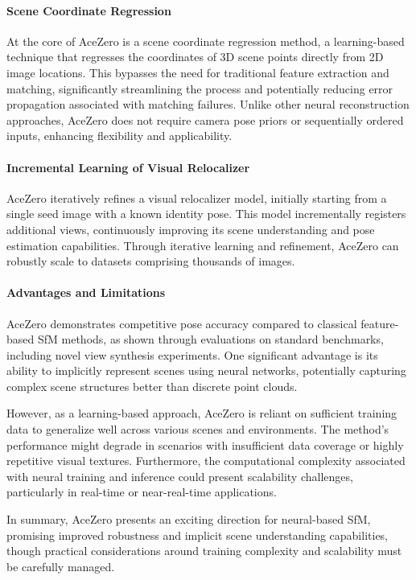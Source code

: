 \paragraph{Scene Coordinate Regression}
At the core of AceZero is a scene coordinate regression method, a learning-based technique that regresses the coordinates of 3D scene points directly from 2D image locations. 
This bypasses the need for traditional feature extraction and matching, significantly streamlining the process and potentially reducing error propagation associated with matching failures. Unlike other neural reconstruction approaches, AceZero does not require camera pose priors or sequentially ordered inputs, enhancing flexibility and applicability.

\paragraph{Incremental Learning of Visual Relocalizer}
AceZero iteratively refines a visual relocalizer model, initially starting from a single seed image with a known identity pose. 
This model incrementally registers additional views, continuously improving its scene understanding and pose estimation capabilities. 
Through iterative learning and refinement, AceZero can robustly scale to datasets comprising thousands of images.

\paragraph{Advantages and Limitations}
AceZero demonstrates competitive pose accuracy compared to classical feature-based SfM methods, as shown through evaluations on standard benchmarks, including novel view synthesis experiments. 
One significant advantage is its ability to implicitly represent scenes using neural networks, potentially capturing complex scene structures better than discrete point clouds.

However, as a learning-based approach, AceZero is reliant on sufficient training data to generalize well across various scenes and environments. The method's performance might degrade in scenarios with insufficient data coverage or highly repetitive visual textures. Furthermore, the computational complexity associated with neural training and inference could present scalability challenges, particularly in real-time or near-real-time applications.

In summary, AceZero presents an exciting direction for neural-based SfM, promising improved robustness and implicit scene understanding capabilities, though practical considerations around training complexity and scalability must be carefully managed.